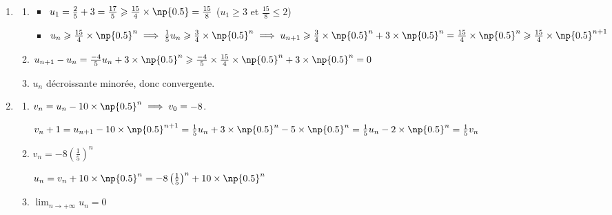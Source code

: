 \documentclass[a4paper,12pt,french]{article}
\begin{document}
\begin{Answer}[number=3]
  \begin{enumerate}
    \item \begin{enumerate}
        \item \begin{itemize}
            \item $u_1 = \frac25 +3 = \frac{17}5 \geqslant
              \frac{15}4\times \np{0.5} = \frac{15}{8}$ ($u_1 \geqslant
              3$ et $\frac{15}8 \leqslant 2$)
            \item $u_n \geqslant \frac{15}4 \times \np{0.5}^n \implies
              \frac15 u_n \geqslant \frac34 \times \np{0.5}^n \implies
              u_{n+1} \geqslant \frac34 \times \np{0.5}^n + 3 \times
              \np{0.5}^n = \frac{15}4 \times \np{0.5}^n \geqslant
              \frac{15}4 \times \np{0.5}^{n+1}$
          \end{itemize}
        \item $u_{n+1} - u_n = \frac{-4}5u_n + 3 \times \np{0.5}^n
          \geqslant \frac{-4}5\times \frac{15}4 \times \np{0.5}^n + 3
          \times \np{0.5}^n = 0$
        \item $u_n$ décroissante minorée, donc convergente.
      \end{enumerate}
    \item \begin{enumerate}
        \item $v_n = u_n - 10\times \np{0.5}^n \implies v_0 = -8$.

          $v_n+1 = u_{n+1} - 10 \times \np{0.5}^{n+1} = \frac15 u_n + 3
          \times \np{0.5}^n - 5 \times \np{0.5}^n = \frac15 u_n -2
          \times \np{0.5}^n = \frac15 v_n$

        \item $v_n = -8\left(\frac15\right)^n$

          $u_n = v_n + 10\times \np{0.5}^n = -8\left(\frac15\right)^n
          +10\times \np{0.5}^n$

        \item $\lim_{n\to+\infty} u_n = 0$
      \end{enumerate}
  \end{enumerate}
\end{Answer}
\end{document}
